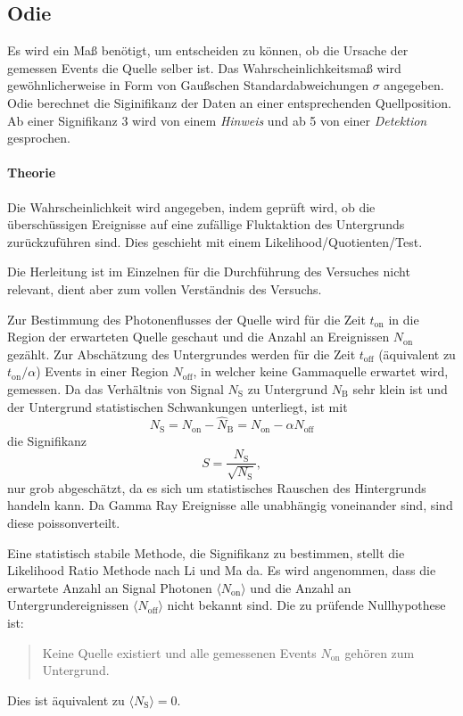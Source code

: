 \subsection{Odie}%
\label{sub:odie}
Es wird ein Maß benötigt, um entscheiden zu können,
ob die Ursache der gemessen Events die Quelle selber ist.
Das Wahrscheinlichkeitsmaß wird gewöhnlicherweise in Form von Gaußschen
Standardabweichungen $\sigma$ angegeben.
Odie berechnet die Siginifikanz der Daten an einer entsprechenden Quellposition.
Ab einer Signifikanz \SI{3}{\sigma} wird von einem \textit{Hinweis}
und ab \SI{5}{\sigma} von einer \textit{Detektion} gesprochen.

\paragraph{Theorie}%

Die Wahrscheinlichkeit wird angegeben, indem geprüft wird,
ob die über\-schüssigen Ereignisse auf eine zufällige
Fluktaktion des Untergrunds zurück\-zu\-führen sind.
Dies geschieht mit einem Likelihood\-/Quotienten\-/Test.

Die Herleitung ist im Einzelnen für die Durchführung des
Versuches nicht relevant,
dient aber zum vollen Verständnis des Versuchs.

Zur Bestimmung des Photonenflusses der Quelle wird für die Zeit $t_\text{on}$ in die Region der
erwarteten Quelle geschaut und die Anzahl an Ereignissen $N_\text{on}$ gezählt.
Zur Abschätzung des Untergrundes werden für die Zeit $t_\text{off}$
(äquivalent zu $t_\text{on} / \alpha$)
Events in einer Region $N_\text{off}$,
in welcher keine Gammaquelle erwartet wird,
gemessen.
Da das Verhältnis von Signal $N_\text{S}$ zu Untergrund
$N_\text{B}$ sehr klein ist
und der Untergrund statistischen Schwankungen unterliegt,
ist mit
\begin{equation}
	N_\text{S} = N_\text{on} - \hat{N}_\text{B} = N_\text{on} - \alpha N_\text{off}
\end{equation}
die Signifikanz
\begin{equation}
	S = \frac{N_\text{S}}{\sqrt{N_\text{S}}},
\end{equation}
nur grob abgeschätzt, da es sich um statistisches Rauschen des
Hintergrunds handeln kann.
Da Gamma Ray Ereignisse alle unabhängig voneinander sind,
sind diese poissonverteilt.

Eine statistisch stabile Methode, die Signifikanz zu bestimmen, stellt die
Likelihood Ratio Methode nach Li und Ma da.
Es wird angenommen, dass die erwartete Anzahl an Signal
Photonen $\langle N_\text{on} \rangle$ und die Anzahl an Untergrundereignissen
$\langle N_\text{off} \rangle$ nicht bekannt sind.
Die zu prüfende Nullhypothese ist:
\begin{quote}
	Keine Quelle existiert und
    alle gemessenen Events $N_\text{on}$ gehören zum Untergrund.
\end{quote}
Dies ist äquivalent zu $\langle N_\text{S} \rangle=0$.

